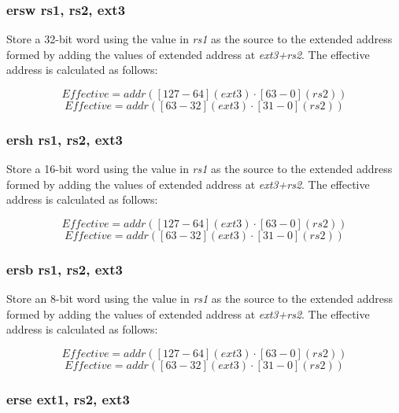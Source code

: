 \documentclass{article}
\begin{document}
\subsubsection{ersw rs1, rs2, ext3}

Store a 32-bit word using the value in \textit{rs1} as the source 
to the extended address formed by adding the values of
extended address at \textit{ext3+rs2}.  The effective address is calculated 
as follows: 

\begin{equation}
Effective = addr([127-64](ext3) \cdot [63-0](rs2))
\end{equation}
\begin{equation}
Effective = addr([63-32](ext3) \cdot [31-0](rs2))
\end{equation}

\subsubsection{ersh rs1, rs2, ext3}

Store a 16-bit word using the value in \textit{rs1} as the source 
to the extended address formed by adding the values of
extended address at \textit{ext3+rs2}.  The effective address is calculated 
as follows: 

\begin{equation}
Effective = addr([127-64](ext3) \cdot [63-0](rs2))
\end{equation}
\begin{equation}
Effective = addr([63-32](ext3) \cdot [31-0](rs2))
\end{equation}

\subsubsection{ersb rs1, rs2, ext3}

Store an 8-bit word using the value in \textit{rs1} as the source 
to the extended address formed by adding the values of
extended address at \textit{ext3+rs2}.  The effective address is calculated 
as follows: 

\begin{equation}
Effective = addr([127-64](ext3) \cdot [63-0](rs2))
\end{equation}
\begin{equation}
Effective = addr([63-32](ext3) \cdot [31-0](rs2))
\end{equation}

\subsubsection{erse ext1, rs2, ext3}
\end{document}
